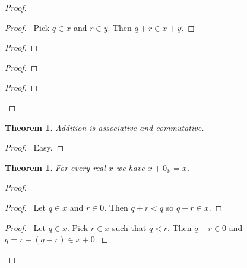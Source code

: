 \documentclass{article}
\let\qed\relax
\newtheorem{theorem}[axiom]{Theorem}
\theoremstyle{definition}
\begin{document}
    \begin{proof}
        \pf
        \begin{proof}
            \pf\ Pick $q \in x$ and $r \in y$. Then $q + r \in x + y$.
        \end{proof}
        \begin{proof}
        \end{proof}
        \begin{proof}
        \end{proof}
        \begin{proof}
        \end{proof}
        \qed
    \end{proof}

    \begin{theorem}
        Addition is associative and commutative.
    \end{theorem}

    \begin{proof}
        \pf\ Easy. \qed
    \end{proof}

    \begin{theorem}
        For every real $x$ we have $x + 0_\mathbb{R} = x$.
    \end{theorem}

    \begin{proof}
        \pf
        \begin{proof}
            \pf\ Let $q \in x$ and $r \in 0$. Then $q + r < q$ so $q + r \in x$.
        \end{proof}
        \begin{proof}
            \pf\ Let $q \in x$. Pick $r \in x$ such that $q < r$. Then $q - r \in 0$ and $q = r + (q-r) \in
            x + 0$.
        \end{proof}
        \qed
    \end{proof}
\end{document}
